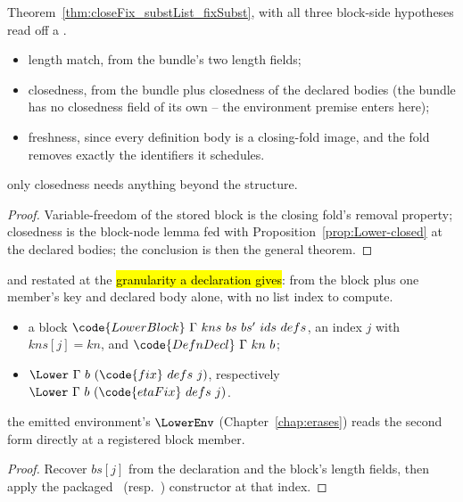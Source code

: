 \begin{proposition}
\label{prop:LowerBlock-substList_fixSubst}
\leanok
{}
 Theorem~\ref{thm:closeFix_substList_fixSubst}, with all three block-side hypotheses
read off a \hl{}.
\begin{itemize}
\item length match, from the bundle's two length fields;
\item closedness, from the bundle plus closedness of the declared bodies (the bundle has no closedness
field of its own -- the environment premise enters here);
\item freshness, since every definition body is a closing-fold image, and the fold removes exactly the
identifiers it schedules.
\end{itemize}
 only closedness needs anything beyond the structure.
\end{proposition}
\begin{proof}
\leanok
{}
 Variable-freedom of the stored block is the closing fold's removal property; closedness is
the block-node lemma fed with Proposition~\ref{prop:Lower-closed} at the declared bodies; the
conclusion is then the general theorem.
\end{proof}

\begin{lemma}
\label{lem:Lower-fixEta_of_block}
\leanok
{}
  and  restated at the \hl{granularity a declaration gives}:
from the block plus one member's key and declared body alone, with no list index to compute.
\begin{itemize}
\item {} a block $\code{LowerBlock}\ \Gamma\ kns\ bs\ bs'\ ids\ defs$, an index $j$ with
$kns[j] = kn$, and $\code{DefnDecl}\ \Gamma\ kn\ b$;
\item {} $\Lower\ \Gamma\ b\ (\code{fix}\ defs\ j)$, respectively
$\Lower\ \Gamma\ b\ (\code{etaFix}\ defs\ j)$.
\end{itemize}
 the emitted environment's $\LowerEnv$ (Chapter~\ref{chap:erases}) reads the second form
directly at a registered block member.
\end{lemma}
\begin{proof}
\leanok
{}
 Recover $bs[j]$ from the declaration and the block's length fields, then apply the packaged
\ (resp.\ ) constructor at that index.
\end{proof}

